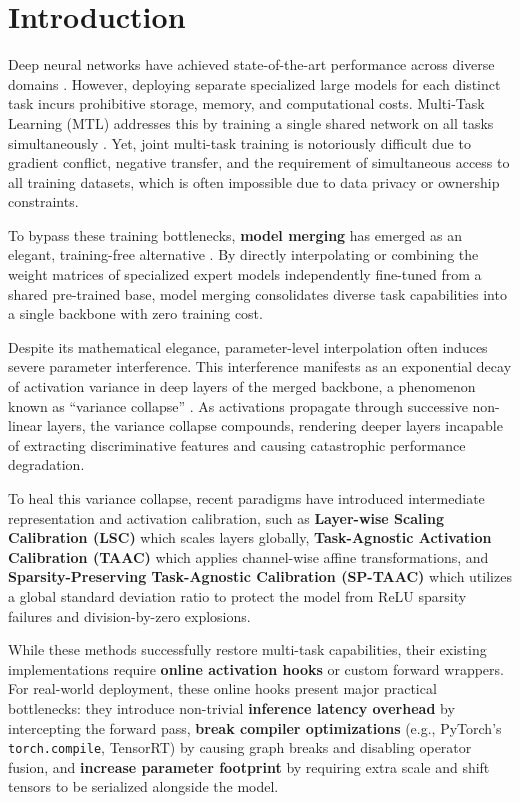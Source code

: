 \documentclass{article}
\begin{document}
\section{Introduction}
Deep neural networks have achieved state-of-the-art performance across diverse domains \cite{he2016deep, vaswani2017attention, devlin2018bert, brown2020language, touvron2023llama}. However, deploying separate specialized large models for each distinct task incurs prohibitive storage, memory, and computational costs. Multi-Task Learning (MTL) addresses this by training a single shared network on all tasks simultaneously \cite{caruana1997multitask, sener2018multi}. Yet, joint multi-task training is notoriously difficult due to gradient conflict, negative transfer, and the requirement of simultaneous access to all training datasets, which is often impossible due to data privacy or ownership constraints.

To bypass these training bottlenecks, \textbf{model merging} has emerged as an elegant, training-free alternative \cite{wortsman2022soups, ilharco2022task, yadav2023ties, yu2024dare}. By directly interpolating or combining the weight matrices of specialized expert models independently fine-tuned from a shared pre-trained base, model merging consolidates diverse task capabilities into a single backbone with zero training cost.

Despite its mathematical elegance, parameter-level interpolation often induces severe parameter interference. This interference manifests as an exponential decay of activation variance in deep layers of the merged backbone, a phenomenon known as ``variance collapse'' \cite{jordan2022repair, anonymous2026b}. As activations propagate through successive non-linear layers, the variance collapse compounds, rendering deeper layers incapable of extracting discriminative features and causing catastrophic performance degradation.

To heal this variance collapse, recent paradigms have introduced intermediate representation and activation calibration, such as \textbf{Layer-wise Scaling Calibration (LSC)} \cite{anonymous2026a} which scales layers globally, \textbf{Task-Agnostic Activation Calibration (TAAC)} \cite{anonymous2026b} which applies channel-wise affine transformations, and \textbf{Sparsity-Preserving Task-Agnostic Calibration (SP-TAAC)} \cite{empiricist2026sptaac} which utilizes a global standard deviation ratio to protect the model from ReLU sparsity failures and division-by-zero explosions.

While these methods successfully restore multi-task capabilities, their existing implementations require \textbf{online activation hooks} or custom forward wrappers. For real-world deployment, these online hooks present major practical bottlenecks: they introduce non-trivial \textbf{inference latency overhead} by intercepting the forward pass, \textbf{break compiler optimizations} (e.g., PyTorch's \texttt{torch.compile}, TensorRT) by causing graph breaks and disabling operator fusion, and \textbf{increase parameter footprint} by requiring extra scale and shift tensors to be serialized alongside the model.
\end{document}
